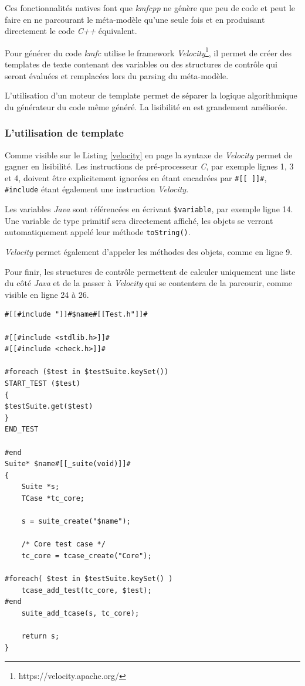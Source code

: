 Ces fonctionnalités natives font que \emph{kmfcpp} ne génère que peu de code et peut le faire en ne parcourant le méta-modèle qu'une seule fois et en produisant directement le code \emph{C++} équivalent.

Pour générer du code \emph{kmfc} utilise le framework \emph{Velocity}\footnote{https://velocity.apache.org/}, il permet de créer des templates de texte contenant des variables ou des structures de contrôle qui seront évaluées et remplacées lors du parsing du méta-modèle.

L'utilisation d'un moteur de template permet de séparer la logique algorithmique du générateur du code même généré. La lisibilité en est grandement améliorée.

\subsubsection{L'utilisation de template}

Comme visible sur le Listing \ref{velocity} en page \pageref{velocity} la syntaxe de \emph{Velocity} permet de gagner en lisibilité. Les instructions de pré-processeur \emph{C}, par exemple lignes 1, 3 et 4, doivent être explicitement ignorées en étant encadrées par \texttt{\#[[ ]]\#}, \texttt{\#include} étant également une instruction \emph{Velocity}.

Les variables \emph{Java} sont référencées en écrivant \texttt{\$variable}, par exemple ligne 14. Une variable de type primitif sera directement affiché, les objets se verront automatiquement appelé leur méthode \texttt{toString()}.

\emph{Velocity} permet également d'appeler les méthodes des objets, comme en ligne 9.

Pour finir, les structures de contrôle permettent de calculer uniquement une liste du côté \emph{Java} et de la passer à \emph{Velocity} qui se contentera de la parcourir, comme visible en ligne 24 à 26.


\begin{lstlisting}[frame=single, label={velocity}]
#[[#include "]]#$name#[[Test.h"]]#

#[[#include <stdlib.h>]]#
#[[#include <check.h>]]#

#foreach ($test in $testSuite.keySet())
START_TEST ($test)
{
$testSuite.get($test)
}
END_TEST

#end
Suite* $name#[[_suite(void)]]#
{
	Suite *s;
	TCase *tc_core;

	s = suite_create("$name");

	/* Core test case */
	tc_core = tcase_create("Core");

#foreach( $test in $testSuite.keySet() )
	tcase_add_test(tc_core, $test);
#end
	suite_add_tcase(s, tc_core);

	return s;
}
\end{lstlisting}

